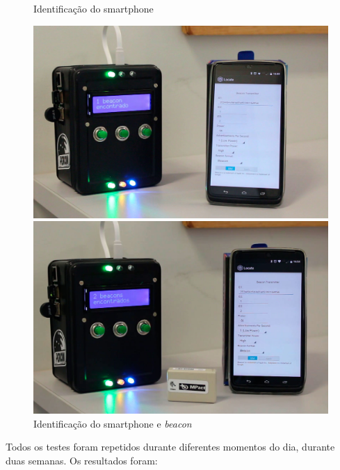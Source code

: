 \begin{figure}[htb]
	\centering
 	\begin{minipage}{0.45\textwidth}
		\centering
		\caption{\label{fig:peacon3}Identificação do smartphone}
		\includegraphics[width=1\textwidth]{img/peacon3.jpg}
	\end{minipage}
	\hfill
	\begin{minipage}{0.45\textwidth}
		\centering
		\caption{\label{fig:peacon4}Identificação do smartphone e \textit{beacon}}
		\includegraphics[width=1\textwidth]{img/peacon4.jpg}
	\end{minipage}
\end{figure}

Todos os testes foram repetidos durante diferentes momentos do dia, durante duas semanas. Os resultados foram:

